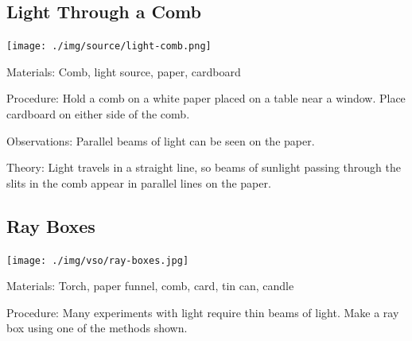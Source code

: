 \begin{multicols}{2}
\vfill
\columnbreak

\subsection{Light Through a Comb}

\begin{center}
\texttt{[image: ./img/source/light-comb.png]}
\end{center}

\begin{description*}
\item[Materials:]{Comb, light source, paper, cardboard}
\item[Procedure:]{Hold a comb on a white paper placed on a table near a window. Place cardboard on either side of the comb.}
\item[Observations:]{Parallel beams of light can be seen on the paper.}
\item[Theory:]{Light travels in a straight line, so beams of sunlight passing through the slits in the comb appear in parallel lines on the paper.}
\end{description*}

\subsection{Ray Boxes}

\begin{center}
\texttt{[image: ./img/vso/ray-boxes.jpg]}
\end{center}

\begin{description*}
\item[Materials:]{Torch, paper funnel, comb, card, tin can, candle}
\item[Procedure:]{Many experiments with light require thin beams of light. Make a ray box using one of the methods shown.}
\end{description*}


\end{multicols}

